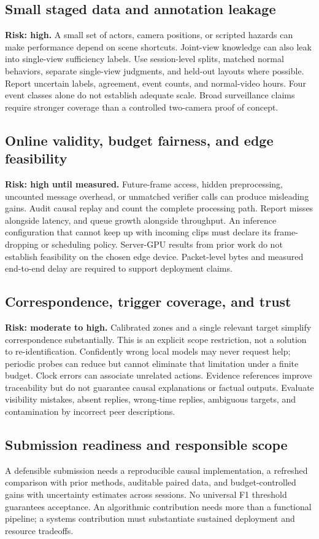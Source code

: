 \documentclass[10pt,a4paper]{article}
\begin{document}
\subsection{Small staged data and annotation leakage}
\textbf{Risk: high.} A small set of actors, camera positions, or scripted hazards can make performance depend on scene shortcuts. Joint-view knowledge can also leak into single-view sufficiency labels. Use session-level splits, matched normal behaviors, separate single-view judgments, and held-out layouts where possible. Report uncertain labels, agreement, event counts, and normal-video hours. Four event classes alone do not establish adequate scale. Broad surveillance claims require stronger coverage than a controlled two-camera proof of concept.

\subsection{Online validity, budget fairness, and edge feasibility}
\textbf{Risk: high until measured.} Future-frame access, hidden preprocessing, uncounted message overhead, or unmatched verifier calls can produce misleading gains. Audit causal replay and count the complete processing path. Report misses alongside latency, and queue growth alongside throughput. An inference configuration that cannot keep up with incoming clips must declare its frame-dropping or scheduling policy. Server-GPU results from prior work do not establish feasibility on the chosen edge device. Packet-level bytes and measured end-to-end delay are required to support deployment claims.

\subsection{Correspondence, trigger coverage, and trust}
\textbf{Risk: moderate to high.} Calibrated zones and a single relevant target simplify correspondence substantially. This is an explicit scope restriction, not a solution to re-identification. Confidently wrong local models may never request help; periodic probes can reduce but cannot eliminate that limitation under a finite budget. Clock errors can associate unrelated actions. Evidence references improve traceability but do not guarantee causal explanations or factual outputs. Evaluate visibility mistakes, absent replies, wrong-time replies, ambiguous targets, and contamination by incorrect peer descriptions.

\subsection{Submission readiness and responsible scope}
A defensible submission needs a reproducible causal implementation, a refreshed comparison with prior methods, auditable paired data, and budget-controlled gains with uncertainty estimates across sessions. No universal F1 threshold guarantees acceptance. An algorithmic contribution needs more than a functional pipeline; a systems contribution must substantiate sustained deployment and resource tradeoffs.
\end{document}
